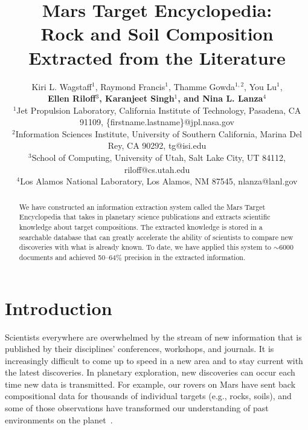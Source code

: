 \documentclass[letterpaper]{article} %
\begin{document}
%
\title{Mars Target Encyclopedia: \\ Rock and Soil Composition Extracted
from the Literature}
\author{
Kiri L. Wagstaff$^1$,
Raymond Francis$^1$,
Thamme Gowda$^{1,2}$,
You Lu$^1$,\\
{\Large \bf 
Ellen Riloff$^3$, 
Karanjeet Singh$^1$, and
Nina L. Lanza$^4$}\\
$^1$Jet Propulsion Laboratory, California Institute of Technology,
Pasadena, CA 91109, \{firstname.lastname\}@jpl.nasa.gov\\
$^2$Information Sciences Institute, University of Southern
California,
Marina Del Rey, CA 90292, tg@isi.edu\\
$^3$School of Computing, University of Utah,
Salt Lake City, UT 84112, riloff@cs.utah.edu\\
$^4$Los Alamos National Laboratory, Los Alamos, NM 87545,
nlanza@lanl.gov\\
}
\maketitle
\begin{abstract}
We have constructed an information extraction system called the Mars
Target Encyclopedia that takes in planetary science publications
and extracts scientific knowledge about target compositions.
The extracted knowledge is stored in a searchable database that can
greatly accelerate the ability of scientists to compare new
discoveries with what is already known.  To date, we have applied this
system to $\sim$6000 documents and achieved 50--64\% precision in the
extracted information.  
\end{abstract}

\section{Introduction}

Scientists everywhere are overwhelmed by the stream of new information
that is published by their disciplines' conferences, workshops, and
journals.  It is increasingly difficult to come up to speed in a
new area and to stay current with the latest discoveries.  In
planetary exploration, new discoveries can occur each time
new data is transmitted.  For example, our rovers on Mars have sent
back compositional data for thousands of individual targets (e.g.,
rocks, soils), and some of those observations have transformed our
understanding of past environments on the
planet~\cite{grotzinger:ykb14}. 
\end{document}
